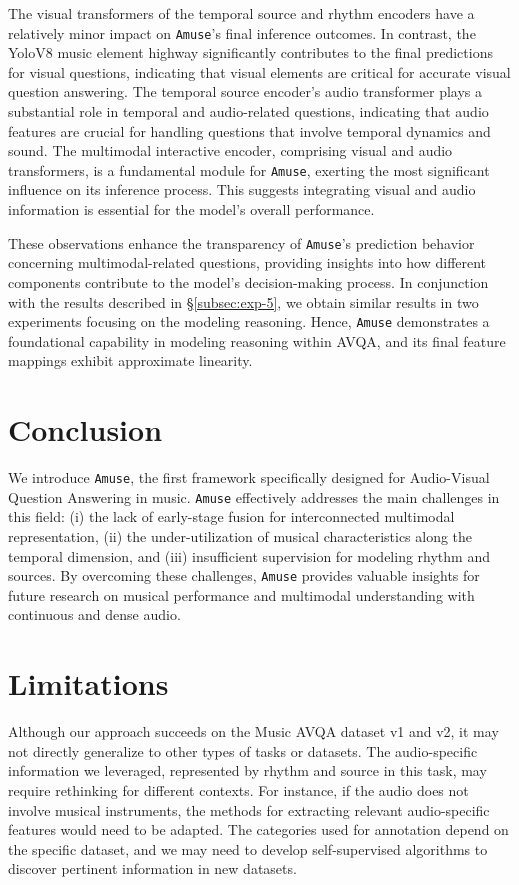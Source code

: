 \documentclass[11pt]{article}
\begin{document}
The visual transformers of the temporal source and rhythm encoders have a relatively minor impact on \texttt{Amuse}'s final inference outcomes. In contrast, the YoloV8 music element highway significantly contributes to the final predictions for visual questions, indicating that visual elements are critical for accurate visual question answering.
The temporal source encoder's audio transformer plays a substantial role in temporal and audio-related questions, indicating that audio features are crucial for handling questions that involve temporal dynamics and sound.
The multimodal interactive encoder, comprising visual and audio transformers, is a fundamental module for \texttt{Amuse}, exerting the most significant influence on its inference process. This suggests integrating visual and audio information is essential for the model's overall performance.

These observations enhance the transparency of \texttt{Amuse}'s prediction behavior concerning multimodal-related questions, providing insights into how different components contribute to the model's decision-making process. In conjunction with the results described in \S\ref{subsec:exp-5}, we obtain similar results in two experiments focusing on the modeling reasoning. Hence, \texttt{Amuse} demonstrates a foundational capability in modeling reasoning within AVQA, and its final feature mappings exhibit approximate linearity.

\section{Conclusion}
We introduce \texttt{Amuse}, the first framework specifically designed for Audio-Visual Question Answering in music. \texttt{Amuse} effectively addresses the main challenges in this field: (i) the lack of early-stage fusion for interconnected multimodal representation, (ii) the under-utilization of musical characteristics along the temporal dimension, and (iii) insufficient supervision for modeling rhythm and sources. By overcoming these challenges, \texttt{Amuse} provides valuable insights for future research on musical performance and multimodal understanding with continuous and dense audio.

\section{Limitations}

Although our approach succeeds on the Music AVQA dataset v1 and v2, it may not directly generalize to other types of tasks or datasets. The audio-specific information we leveraged, represented by rhythm and source in this task, may require rethinking for different contexts. For instance, if the audio does not involve musical instruments, the methods for extracting relevant audio-specific features would need to be adapted. The categories used for annotation depend on the specific dataset, and we may need to develop self-supervised algorithms to discover pertinent information in new datasets.
\end{document}
